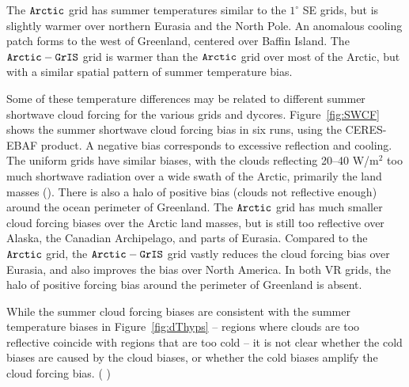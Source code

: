 \documentclass[draft]{agujournal2019}
\begin{document}
The $\tt Arctic$ grid has summer temperatures similar to the $1^{\circ}$ SE grids, but is slightly warmer over northern Eurasia and the North Pole. An anomalous cooling patch forms to the west of Greenland, centered over Baffin Island. The $\tt Arctic-GrIS$ grid is warmer than the $\tt Arctic$ grid over most of the Arctic, but with a similar spatial pattern of summer temperature bias.

Some of these temperature differences may be related to different summer shortwave cloud forcing for the various grids and dycores. Figure~\ref{fig:SWCF} shows the summer shortwave cloud forcing bias in six runs, using the CERES-EBAF product. 
A negative bias corresponds to excessive reflection and cooling.
The uniform grids have similar biases, with the clouds reflecting 20--40 W/m$^2$ too much shortwave radiation over a wide swath of the Arctic, primarily the land masses ({\color{blue}{please explain what SWCF in caption.}}). There is also a halo of positive bias (clouds not reflective enough) around the ocean perimeter of Greenland. The $\tt Arctic$ grid has much smaller cloud forcing biases over the Arctic land masses, but is still too reflective over Alaska, the Canadian Archipelago, and parts of Eurasia.  Compared to the $\tt Arctic$ grid, the $\tt Arctic-GrIS$ grid vastly reduces the cloud forcing bias over Eurasia, and also improves the bias over North America. In both VR grids, the halo of positive forcing bias around the perimeter of Greenland is absent.

While the summer cloud forcing biases are consistent with the summer temperature biases in Figure~\ref{fig:dThyps} -- regions where clouds are too reflective coincide with regions that are too cold -- it is not clear whether the cold biases are caused by the cloud biases, or whether the cold biases amplify the cloud forcing bias. ({\color{blue}{This ends abruptly. Anything else to add?}} {\color{purple}{Causation I agree is hard to prove due to energy transport, but in summer cloud fraction is probably playing a role. The likely other thing that could be playing a role is surface albedo (absorbed solar). Could note that.}})
\end{document}
